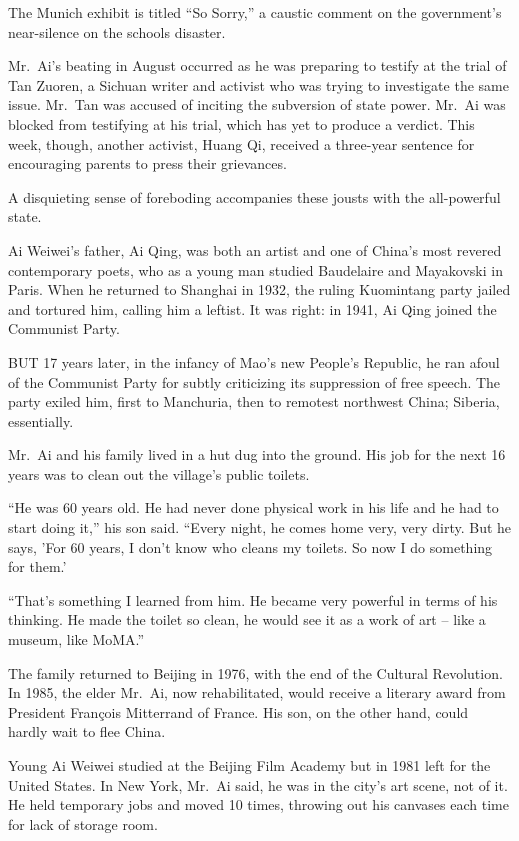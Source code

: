﻿\documentclass[12pt]{article}
\begin{document}
The Munich exhibit is titled ``So Sorry,'' a caustic comment on the government's near-silence on the
schools disaster.

Mr.~Ai's beating in August occurred as he was preparing to testify at the trial of Tan Zuoren, a
Sichuan writer and activist who was trying to investigate the same issue. Mr.~Tan was accused of
inciting the subversion of state power. Mr.~Ai was blocked from testifying at his trial, which has
yet to produce a verdict. This week, though, another activist, Huang Qi, received a three-year
sentence for encouraging parents to press their grievances.

A disquieting sense of foreboding accompanies these jousts with the all-powerful state.

Ai Weiwei's father, Ai Qing, was both an artist and one of China's most revered contemporary poets,
who as a young man studied Baudelaire and Mayakovski in Paris. When he returned to Shanghai in 1932,
the ruling Kuomintang party jailed and tortured him, calling him a leftist. It was right: in 1941,
Ai Qing joined the Communist Party.

BUT 17 years later, in the infancy of Mao's new People's Republic, he ran afoul of the Communist
Party for subtly criticizing its suppression of free speech. The party exiled him, first to
Manchuria, then to remotest northwest China; Siberia, essentially.

Mr.~Ai and his family lived in a hut dug into the ground. His job for the next 16 years was to clean
out the village's public toilets.

``He was 60 years old. He had never done physical work in his life and he had to start doing it,''
his son said. ``Every night, he comes home very, very dirty. But he says, 'For 60 years, I don't
know who cleans my toilets. So now I do something for them.'

``That's something I learned from him. He became very powerful in terms of his thinking. He made the
toilet so clean, he would see it as a work of art -- like a museum, like MoMA.''

The family returned to Beijing in 1976, with the end of the Cultural Revolution. In 1985, the elder
Mr.~Ai, now rehabilitated, would receive a literary award from President François Mitterrand of
France. His son, on the other hand, could hardly wait to flee China.

Young Ai Weiwei studied at the Beijing Film Academy but in 1981 left for the United States. In New
York, Mr.~Ai said, he was in the city's art scene, not of it. He held temporary jobs and moved 10
times, throwing out his canvases each time for lack of storage room.
\end{document}
